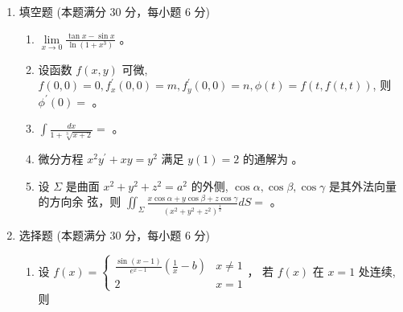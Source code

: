 

\begin{enumerate}
	\item
填空题 (本题满分 30 分，每小题 6 分)
\begin{enumerate}
	\item
$\lim\limits _{x \rightarrow 0} \frac{\tan x-\sin x}{\ln \left(1+x^{3}\right)}$  。


\item
设函数 $f(x, y)$ 可微, $f(0,0)=0, f_{x}^{\prime}(0,0)=m, f_{y}^{\prime}(0,0)=n, \phi(t)=f(t, f(t, t))$, 则 $\phi^{\prime}(0)=$  。


\item
$\int \frac{d x}{1+\sqrt[3]{x+2}}=$  。


\item
微分方程 $x^{2} y^{\prime}+x y=y^{2}$ 满足 $y(1)=2$ 的通解为  。


\item
设 $\Sigma$ 是曲面 $x^{2}+y^{2}+z^{2}=a^{2}$ 的外侧, $\cos \alpha, \cos \beta, \cos \gamma$ 是其外法向量的方向余 弦，则 $\iint_{\Sigma} \frac{x \cos \alpha+y \cos \beta+z \cos \gamma}{\left(x^{2}+y^{2}+z^{2}\right)^{\frac{1}{2}}} d S=$ \tk{$ 4\pi $} 。
	
	
	
	
\end{enumerate}

\item 
选择题 (本题满分 30 分，每小题 6 分)
\begin{enumerate}
	\item
设 $f(x)=\left\{\begin{array}{ll}\frac{\sin (x-1)}{e^{x-1}}\left(\frac{1}{x}-b\right) & x \neq 1 \\ 2 & x=1\end{array}\right.$， 若 $f(x)$ 在 $x=1$ 处连续, 则  


\end{enumerate}
\end{enumerate}
